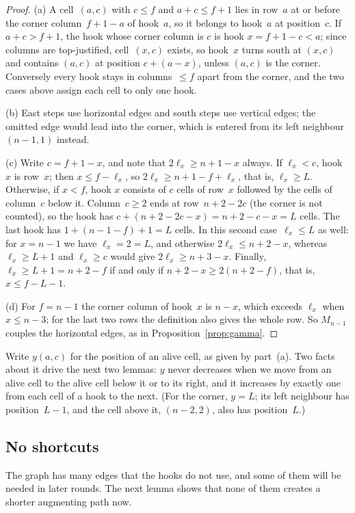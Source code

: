 \begin{proof}
(a) A cell~$(a,c)$ with $c\le f$ and $a+c\le f+1$ lies in row~$a$ at or
before the corner column~$f+1-a$ of hook~$a$, so it belongs to hook~$a$ at
position~$c$. If $a+c>f+1$, the hook whose corner column is $c$ is hook
$x=f+1-c<a$; since columns are top-justified, cell~$(x,c)$ exists, so
hook~$x$ turns south at $(x,c)$ and contains $(a,c)$ at position
$c+(a-x)$, unless $(a,c)$ is the corner. Conversely every hook stays in
columns~$\le f$ apart from the corner, and the two cases above assign each
cell to only one hook.

(b) East steps use horizontal edges and south steps use vertical edges;
the omitted edge would lead into the corner, which is entered from its
left neighbour $(n-1,1)$ instead.

(c) Write $c=f+1-x$, and note that $2\ell_x\ge n+1-x$ always. If
$\ell_x<c$, hook~$x$ is row~$x$; then $x\le f-\ell_x$, so
$2\ell_x\ge n+1-f+\ell_x$, that is, $\ell_x\ge L$. Otherwise, if $x<f$, hook
$x$ consists of $c$ cells of row~$x$ followed by the cells of column~$c$
below it. Column~$c\ge2$ ends at row~$n+2-2c$ (the corner is not counted),
so the hook has $c+(n+2-2c-x)=n+2-c-x=L$ cells. The last hook has
$1+(n-1-f)+1=L$ cells. In this second case~$\ell_x\le L$ as well: for
$x=n-1$ we have $\ell_x=2=L$, and otherwise $2\ell_x\le n+2-x$, whereas
$\ell_x\ge L+1$ and $\ell_x\ge c$ would give $2\ell_x\ge n+3-x$. Finally,
$\ell_x\ge L+1=n+2-f$ if and only if $n+2-x\ge2(n+2-f)$, that is,
$x\le f-L-1$.

(d) For $f=n-1$ the corner column of hook~$x$ is $n-x$, which exceeds
$\ell_x$ when $x\le n-3$; for the last two rows the definition also gives
the whole row. So $M_{n-1}$ couples the horizontal edges, as in
Proposition~\ref{prop:gamma}.
\end{proof}

Write $y(a,c)$ for the position of an alive cell, as given by part~(a).
Two facts about it drive the next two lemmas: $y$ never decreases when we
move from an alive cell to the alive cell below it or to its right, and it
increases by exactly one from each cell of a hook to the next. (For the
corner, $y=L$; its left neighbour has position~$L-1$, and the cell above it,
$(n-2,2)$, also has position~$L$.)

\subsection{No shortcuts}

The graph has many edges that the hooks do not use, and some of them will
be needed in later rounds. The next lemma shows that none of them
creates a shorter augmenting path now.


